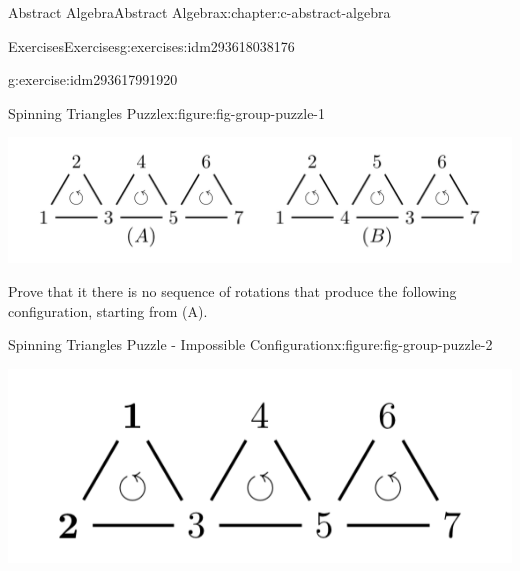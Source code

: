 \documentclass[twoside,10pt,]{book}
\numberwithin{equation}{section}
\begin{document}
\begin{chapterptx}{Abstract Algebra}{}{Abstract Algebra}{}{}{x:chapter:c-abstract-algebra}
\begin{exercises-section}{Exercises}{}{Exercises}{}{}{g:exercises:idm293618038176}
\begin{divisionexercise}{7}{}{}{g:exercise:idm293617991920}
\begin{figureptx}{Spinning Triangles Puzzle}{x:figure:fig-group-puzzle-1}{}
\begin{image}{0}{1}{0}
\includegraphics[width=\linewidth]{images/fig-group-puzzle-1.png}
\end{image}%
\tcblower
\end{figureptx}%
Prove that it there is no sequence of rotations that produce the following configuration, starting from (A).%
\begin{figureptx}{Spinning Triangles Puzzle - Impossible Configuration}{x:figure:fig-group-puzzle-2}{}%
\begin{image}{0}{1}{0}%
\includegraphics[width=\linewidth]{images/fig-group-puzzle-2.png}
\end{image}%
\tcblower
\end{figureptx}%
\end{divisionexercise}%
\end{exercises-section}
\end{chapterptx}
%
%
\typeout{************************************************}
\typeout{************************************************}
%
\end{document}
